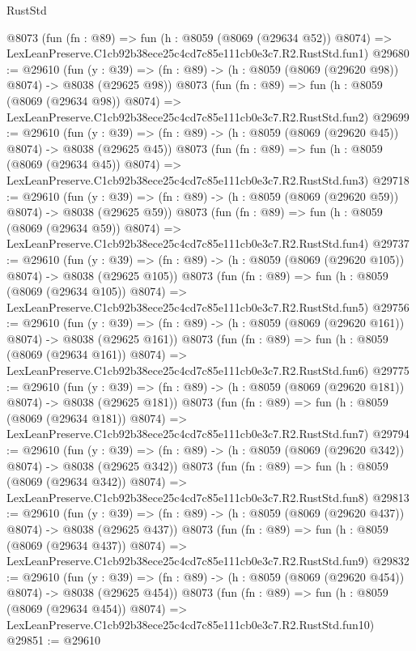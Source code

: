 \begin{lexlean}{RustStd}
\begin{coremodule}
    @8073
    (fun (fn : @89) =>
    fun (h : @8059 (@8069 (@29634 @52)) @8074) =>
    LexLeanPreserve.C1cb92b38ece25c4cd7c85e111cb0e3c7.R2.RustStd.fun1)
@29680 := @29610
    (fun (y : @39) => (fn : @89) -> (h : @8059 (@8069 (@29620 @98)) @8074) -> @8038 (@29625 @98))
    @8073
    (fun (fn : @89) =>
    fun (h : @8059 (@8069 (@29634 @98)) @8074) =>
    LexLeanPreserve.C1cb92b38ece25c4cd7c85e111cb0e3c7.R2.RustStd.fun2)
@29699 := @29610
    (fun (y : @39) => (fn : @89) -> (h : @8059 (@8069 (@29620 @45)) @8074) -> @8038 (@29625 @45))
    @8073
    (fun (fn : @89) =>
    fun (h : @8059 (@8069 (@29634 @45)) @8074) =>
    LexLeanPreserve.C1cb92b38ece25c4cd7c85e111cb0e3c7.R2.RustStd.fun3)
@29718 := @29610
    (fun (y : @39) => (fn : @89) -> (h : @8059 (@8069 (@29620 @59)) @8074) -> @8038 (@29625 @59))
    @8073
    (fun (fn : @89) =>
    fun (h : @8059 (@8069 (@29634 @59)) @8074) =>
    LexLeanPreserve.C1cb92b38ece25c4cd7c85e111cb0e3c7.R2.RustStd.fun4)
@29737 := @29610
    (fun (y : @39) => (fn : @89) -> (h : @8059 (@8069 (@29620 @105)) @8074) -> @8038 (@29625 @105))
    @8073
    (fun (fn : @89) =>
    fun (h : @8059 (@8069 (@29634 @105)) @8074) =>
    LexLeanPreserve.C1cb92b38ece25c4cd7c85e111cb0e3c7.R2.RustStd.fun5)
@29756 := @29610
    (fun (y : @39) => (fn : @89) -> (h : @8059 (@8069 (@29620 @161)) @8074) -> @8038 (@29625 @161))
    @8073
    (fun (fn : @89) =>
    fun (h : @8059 (@8069 (@29634 @161)) @8074) =>
    LexLeanPreserve.C1cb92b38ece25c4cd7c85e111cb0e3c7.R2.RustStd.fun6)
@29775 := @29610
    (fun (y : @39) => (fn : @89) -> (h : @8059 (@8069 (@29620 @181)) @8074) -> @8038 (@29625 @181))
    @8073
    (fun (fn : @89) =>
    fun (h : @8059 (@8069 (@29634 @181)) @8074) =>
    LexLeanPreserve.C1cb92b38ece25c4cd7c85e111cb0e3c7.R2.RustStd.fun7)
@29794 := @29610
    (fun (y : @39) => (fn : @89) -> (h : @8059 (@8069 (@29620 @342)) @8074) -> @8038 (@29625 @342))
    @8073
    (fun (fn : @89) =>
    fun (h : @8059 (@8069 (@29634 @342)) @8074) =>
    LexLeanPreserve.C1cb92b38ece25c4cd7c85e111cb0e3c7.R2.RustStd.fun8)
@29813 := @29610
    (fun (y : @39) => (fn : @89) -> (h : @8059 (@8069 (@29620 @437)) @8074) -> @8038 (@29625 @437))
    @8073
    (fun (fn : @89) =>
    fun (h : @8059 (@8069 (@29634 @437)) @8074) =>
    LexLeanPreserve.C1cb92b38ece25c4cd7c85e111cb0e3c7.R2.RustStd.fun9)
@29832 := @29610
    (fun (y : @39) => (fn : @89) -> (h : @8059 (@8069 (@29620 @454)) @8074) -> @8038 (@29625 @454))
    @8073
    (fun (fn : @89) =>
    fun (h : @8059 (@8069 (@29634 @454)) @8074) =>
    LexLeanPreserve.C1cb92b38ece25c4cd7c85e111cb0e3c7.R2.RustStd.fun10)
@29851 := @29610

\end{coremodule}
\end{lexlean}
